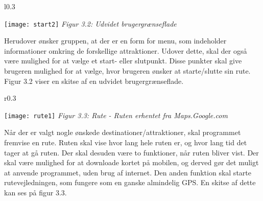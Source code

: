 \begin{wrapfigure}{l}{0.3\textwidth}
	\vspace{-50pt}
	\begin{center}
		\texttt{[image: start2]} \newline
		\textit{Figur 3.2: \newline Udvidet brugergrænseflade}\newline
	\end{center}
	\vspace{20pt}
\end{wrapfigure}

Herudover ønsker gruppen, at der er en form for menu, som indeholder informationer omkring de forskellige attraktioner. Udover dette, skal der også være mulighed for at vælge et start- eller slutpunkt. Disse punkter skal give brugeren mulighed for at vælge, hvor brugeren ønsker at starte/slutte sin rute. Figur 3.2 viser en skitse af en udvidet brugergrænseflade.\newline
\newline
\newline
\newline
\newline

\begin{wrapfigure}{r}{0.3\textwidth}
	\vspace{-30pt}
	\begin{center}
		\texttt{[image: rute1]} \newline
		\textit{Figur 3.3: Rute - Ruten er\newline hentet fra Maps.Google.com}\newline
	\end{center}
	\vspace{0pt}
	\vspace{-100pt}
\end{wrapfigure}


Når der er valgt nogle ønskede destinationer/attraktioner, skal programmet fremvise en rute. Ruten skal vise hvor lang hele ruten er, og hvor lang tid det tager at gå ruten. Der skal desuden være to funktioner, når ruten bliver vist. Der skal være mulighed for at downloade kortet på mobilen, og derved gør det muligt at anvende programmet, uden brug af internet. Den anden funktion skal starte rutevejledningen, som fungere som en ganske almindelig GPS. En skitse af dette kan ses på figur 3.3.\newline
\newline
\newline
\newline
\newline
\newline
\newline
\newline


